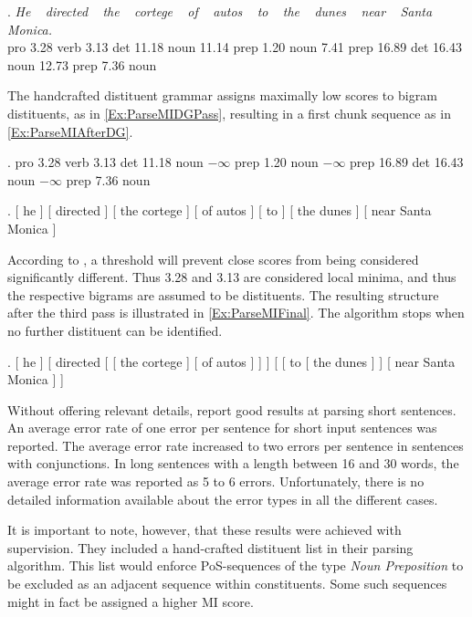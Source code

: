 \documentclass[11pt,a4paper,english]{article}
\begin{document}
\exg. {\small\textit{He} ~ \textit{directed} ~ \textit{the} ~ \textit{cortege} ~ \textit{of} ~ \textit{autos} ~ \textit{to} ~ \textit{the} ~ \textit{dunes} ~ \textit{near} ~ \textit{Santa Monica.}}\\
      {\small pro 3.28 verb 3.13 det 11.18 noun 11.14 prep 1.20 noun 7.41 prep 16.89 det 16.43 noun 12.73 prep 7.36 noun}\\\label{Ex:ParseMI}

The handcrafted distituent grammar assigns maximally low scores to bigram distituents, as in \ref{Ex:ParseMIDGPass}, resulting in a first chunk sequence as in \ref{Ex:ParseMIAfterDG}.

\ex.\label{Ex:ParseMIDGPass} pro 3.28 verb 3.13 det 11.18 noun $-\infty$ prep 1.20 noun $-\infty$ prep 16.89 det 16.43 noun $-\infty$ prep 7.36 noun

\ex.\label{Ex:ParseMIAfterDG} {[ he ] [ directed ] [ the cortege ] [ of autos ] [ to ] [ the dunes ] [ near Santa Monica ]}

According to \citet[pg.\ 987]{Magerman:Marcus:1990}, a threshold will prevent close scores from being considered significantly different. Thus 3.28 and 3.13 are considered local minima, and thus the respective bigrams are assumed to be distituents. The resulting structure after the third pass is illustrated in \ref{Ex:ParseMIFinal}. The algorithm stops when no further distituent can be identified.

\ex.\label{Ex:ParseMIFinal} [ he ] [ directed [ [ the cortege ] [ of autos ] ] ]  [ [ to [ the dunes ] ]  [ near Santa Monica ] ]

Without offering relevant details, \cite{Magerman:Marcus:1990} report good results at parsing short sentences. An average error rate of one error per sentence for short input sentences was reported. The average error rate increased to two errors per sentence in sentences with conjunctions. In long sentences with a length between 16 and 30 words, the average error rate was reported as 5 to 6 errors. Unfortunately, there is no detailed information available about the error types in all the different cases.

It is important to note, however, that these results were achieved with supervision. They included a hand-crafted distituent list in their parsing algorithm. This list would enforce PoS-sequences of the type \textit{Noun Preposition} to be excluded as an adjacent sequence within constituents. Some such sequences might in fact be assigned a higher MI score.
\end{document}
